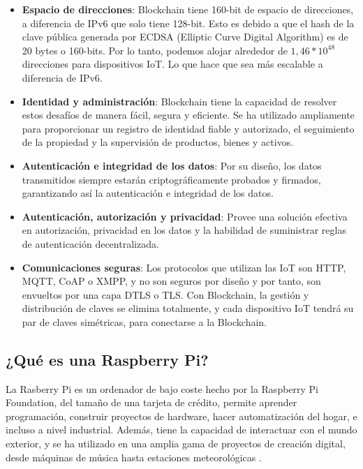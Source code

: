 \begin{itemize}
    \item \textbf{Espacio de direcciones}: Blockchain tiene 160-bit de espacio de direcciones, a diferencia de IPv6
    que solo tiene 128-bit. Esto es debido a que el hash de la clave pública generada por ECDSA (Elliptic Curve Digital
    Algorithm) es de 20 bytes o 160-bits. Por lo tanto, podemos alojar alrededor de \(1,46*10^{48}\) direcciones para 
    dispositivos IoT. Lo que hace que sea más escalable a diferencia de IPv6. 
    \item \textbf{Identidad y administración}: Blockchain tiene la capacidad de resolver estos desafíos de manera fácil, 
    segura y eficiente. Se ha utilizado ampliamente para proporcionar un registro de identidad fiable y autorizado, 
    el seguimiento de la propiedad y la supervisión de productos, bienes y activos.
    \item \textbf{Autenticación e integridad de los datos}: Por su diseño, los datos transmitidos siempre estarán
    criptográficamente probados y firmados, garantizando así la autenticación e integridad de los datos.
    \item \textbf{Autenticación, autorización y privacidad}: Provee una solución efectiva en autorización, privacidad en
    los datos y la habilidad de suministrar reglas de autenticación decentralizada. 
    \item \textbf{Comunicaciones seguras}: Los protocolos que utilizan las IoT son HTTP, MQTT, CoAP o XMPP, y no son 
    seguros por diseño y por tanto, son envueltos por una capa DTLS o TLS. Con Blockchain, la gestión y distribución 
    de claves se elimina totalmente, y cada dispositivo IoT tendrá su par de claves simétricas, para conectarse a la 
    Blockchain.
\end{itemize}

\subsection{¿Qué es una Raspberry Pi?}

La Rasberry Pi es un ordenador de bajo coste hecho por la Raspberry Pi Foundation, del tamaño de una tarjeta de crédito, 
permite aprender programación, construir proyectos de hardware, hacer automatización del hogar, e incluso a nivel 
industrial. Además, tiene la capacidad de interactuar con el mundo exterior, y se ha utilizado en una amplia gama de 
proyectos de creación digital, desde máquinas de música hasta estaciones meteorológicas \cite{what-is-rasp}.


